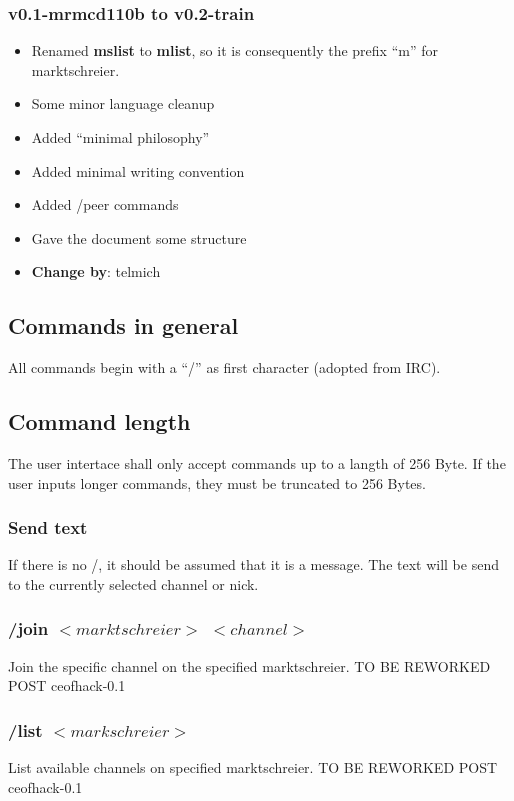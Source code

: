 \documentclass[12pt,a4paper]{book}
\begin{document}
\subsubsection{v0.1-mrmcd110b to v0.2-train}
   \begin{itemize}
      \item Renamed \textbf{mslist} to \textbf{mlist}, so it is consequently the prefix
      "`m"' for marktschreier.
      \item Some minor language cleanup 
      \item Added "`minimal philosophy"'
      \item Added minimal writing convention
      \item Added /peer commands
      \item Gave the document some structure
      \item \textbf{Change by}: telmich
   \end{itemize}

\subsection{Commands in general}
All commands begin with a "`/"' as first character (adopted from IRC).
\subsection{Command length}
The user intertace shall only accept commands up to a langth of 256 Byte.
If the user inputs longer commands, they must be truncated
to 256 Bytes.
\subsubsection{Send text}
If there is no /, it should be assumed that it is a message.
The text will be send to the currently selected channel or nick.

\subsubsection{/join $<marktschreier>$ $<channel>$}
Join the specific channel on the specified marktschreier.
TO BE REWORKED
POST ceofhack-0.1
\subsubsection{/list $<markschreier>$}
List available channels on specified marktschreier.
TO BE REWORKED
POST ceofhack-0.1
\end{document}
